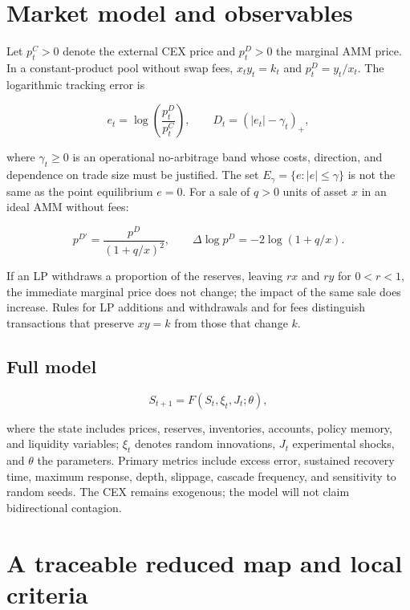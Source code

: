 \section{Market model and observables}

Let $p_t^C>0$ denote the external CEX price and $p_t^D>0$ the marginal AMM price.
In a constant-product pool without swap fees, $x_ty_t=k_t$ and $p_t^D=y_t/x_t$. The
logarithmic tracking error is

\begin{equation}
  e_t=\log\left(\frac{p_t^D}{p_t^C}\right), \qquad
  D_t=(|e_t|-\gamma_t)_+,
\end{equation}

where $\gamma_t\geq 0$ is an operational no-arbitrage band whose costs, direction, and
dependence on trade size must be justified. The set
$E_\gamma=\{e:|e|\leq\gamma\}$ is not the same as the point equilibrium $e=0$. For a
sale of $q>0$ units of asset $x$ in an ideal AMM without fees:

\begin{equation}
  p^{D\prime}=\frac{p^D}{(1+q/x)^2}, \qquad
  \Delta\log p^D=-2\log(1+q/x).
\end{equation}

If an LP withdraws a proportion of the reserves, leaving $rx$ and $ry$ for $0<r<1$,
the immediate marginal price does not change; the impact of the same sale does
increase. Rules for LP additions and withdrawals and for fees distinguish
transactions that preserve $xy=k$ from those that change $k$.

\subsection{Full model}

\begin{equation}
  S_{t+1}=F(S_t,\xi_t,J_t;\theta),
\end{equation}

where the state includes prices, reserves, inventories, accounts, policy memory, and
liquidity variables; $\xi_t$ denotes random innovations, $J_t$ experimental shocks,
and $\theta$ the parameters. Primary metrics include excess error, sustained recovery
time, maximum response, depth, slippage, cascade frequency, and sensitivity to random
seeds. The CEX remains exogenous; the model will not claim bidirectional contagion.

\section{A traceable reduced map and local criteria}

